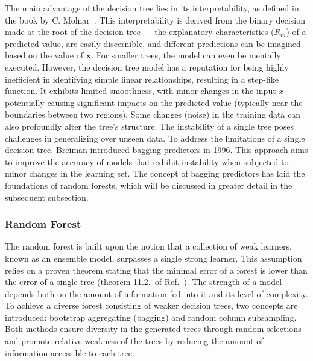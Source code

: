 \documentclass[main]{subfiles}
\begin{document}
The main advantage of the decision tree lies in its interpretability, as defined in the book by C. Molnar~\cite{molnar2020interpretable}. This interpretability is derived from the binary decision made at the root of the decision tree --- the explanatory characteristics ($R_m$) of a predicted value, are easily discernible, and different predictions can be imagined based on the value of $\mathbf{x}$. For smaller trees, the model can even be mentally executed. However, the decision tree model has a reputation for being highly inefficient in identifying simple linear relationships, resulting in a step-like function. It exhibits limited smoothness, with minor changes in the input $x$ potentially causing significant impacts on the predicted value (typically near the boundaries between two regions). Some changes (noise) in the training data can also profoundly alter the tree's structure. The instability of a single tree poses challenges in generalizing over unseen data.\autocite{molnar2020interpretable} To address the limitations of a single decision tree, Breiman introduced bagging predictors in 1996. This approach aims to improve the accuracy of models that exhibit instability when subjected to minor changes in the learning set.\autocite{Breiman_1996} The concept of bagging predictors has laid the foundations of random forests, which will be discussed in greater detail in the subsequent subsection.

\subsubsection{Random Forest}

The random forest is built upon the notion that a collection of weak learners, known as an ensemble model, surpasses a single strong learner. This assumption relies on a proven theorem stating that the minimal error of a forest is lower than the error of a single tree (theorem 11.2.\ of Ref.~\cite{Breiman_2001}). The strength of a model depends both on the amount of information fed into it and its level of complexity. To achieve a diverse forest consisting of weaker decision trees, two concepts are introduced: bootstrap aggregating (bagging) and random column subsampling. Both methods ensure diversity in the generated trees through random selections and promote relative weakness of the trees by reducing the amount of information accessible to each tree.
\end{document}

